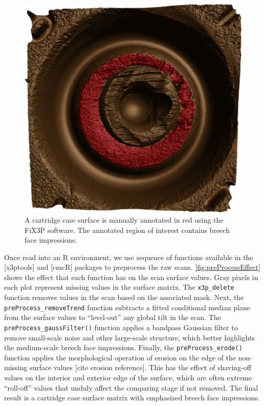 \documentclass[
]{jdssv}
\begin{document}
\begin{CodeChunk}
\begin{figure}[htbp]

{\centering \includegraphics[width=.6\textwidth]{images/annotatedReference} 

}

\caption{\label{fig:annotatedScan} A cartridge case surface is manually annotated in red using the FiX3P software. The annotated region of interest contains breech face impressions.}\label{fig:unnamed-chunk-1}
\end{figure}
\end{CodeChunk}

Once read into an R environment, we use sequence of functions available
in the {[}x3ptools{]} and {[}cmcR{]} packages to preprocess the raw
scans. \autoref{fig:preProcessEffect} shows the effect that each
function has on the scan surface values. Gray pixels in each plot
represent missing values in the surface matrix. The \texttt{x3p\_delete}
function removes values in the scan based on the associated mask. Next,
the \texttt{preProcess\_removeTrend} function subtracts a fitted
conditional median plane from the surface values to ``level-out'' any
global tilt in the scan. The \texttt{preProcess\_gaussFilter()} function
applies a bandpass Gaussian filter to remove small-scale noise and other
large-scale structure, which better highlights the medium-scale breech
face impressions. Finally, the \texttt{preProcess\_erode()} function
applies the morphological operation of erosion on the edge of the
non-missing surface values {[}cite erosion reference{]}. This has the
effect of shaving-off values on the interior and exterior edge of the
surface, which are often extreme ``roll-off'' values that unduly affect
the comparing stage if not removed. The final result is a cartridge case
surface matrix with emphasized breech face impressions.
\end{document}
